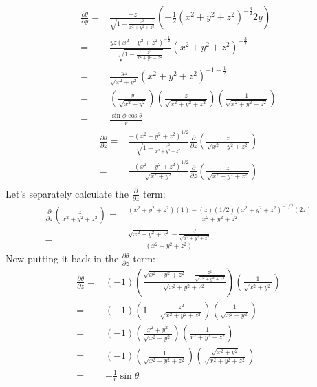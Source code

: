                 \begin{align*}
                     \frac{\partial\theta}{\partial y} = & \frac{-z}{\sqrt{1-\frac{z^2}{x^2 + y^2 + z^2}}}\left(-\frac{1}{2}\left(x^2 + y^2 + z^2\right)^{-\frac{3}{2}}2y\right) \\
                     = & \frac{yz\left(x^2+y^2+z^2\right)^{-\frac{1}{2}}}{\sqrt{1-\frac{z^2}{x^2 + y^2 + z^2}}}\left(x^2 + y^2 + z^2\right)^{-\frac{3}{2}} \\
                     = & \frac{yz}{\sqrt{x^2 + y^2}}\left(x^2 + y^2 + z^2\right)^{-1-\frac{1}{2}} \\
                     = & \left(\frac{y}{\sqrt{x^2 + y^2}}\right)\left(\frac{z}{\sqrt{x^2 + y^2 + z^2}}\right)\left(\frac{1}{\sqrt{x^2 + y^2 + z^2}}\right) \\
                     = & \frac{\sin\phi\cos\theta}{r}
                \end{align*}
                \begin{align*}
                    \frac{\partial\theta}{\partial z} = & \frac{-\left(x^2 + y^2 + z^2\right)^{1/2}}{\sqrt{1-\frac{z^2}{x^2 + y^2 + z^2}}}\frac{\partial}{\partial z}\left(\frac{z}{\sqrt{x^2 + y^2 + z^2}}\right) \\
                    = & \frac{-\left(x^2 + y^2 + z^2\right)^{1/2}}{\sqrt{x^2 + y^2}}\frac{\partial}{\partial z}\left(\frac{z}{\sqrt{x^2 + y^2 + z^2}}\right) \\
                \end{align*}
                Let's separately calculate the $\frac{\partial}{\partial z}$ term:
                \begin{align*}
                    \frac{\partial}{\partial z}\left(\frac{z}{x^2 + y^2 + z^2}\right) = & \frac{
                        \left(x^2 + y^2 + z^2\right)(1) - (z)(1/2)\left(x^2 + y^2 + z^2\right)^{-1/2}(2z)
                    }{x^2 + y^2 + z^2}\\
                    = & \frac{\sqrt{x^2 + y^2 + z^2} - \frac{z^2}{\sqrt{x^2 + y^2 + z^2}}}{(x^2 + y^2 + z^2)}
                \end{align*}
                Now putting it back in the $\frac{\partial\theta}{\partial z}$ term:
                \begin{align*}
                    \frac{\partial\theta}{\partial z} = & (-1)\left(\frac{\sqrt{x^2 + y^2 + z^2} - \frac{z^2}{\sqrt{x^2 + y^2 + z^2}}}{\sqrt{x^2 + y^2 + z^2}}\right)\left(\frac{1}{\sqrt{x^2 + y^2}}\right) \\
                    = & (-1)\left(1-\frac{z^2}{\sqrt{x^2 + y^2 + z^2}}\right)\left(\frac{1}{\sqrt{x^2 + y^2}}\right) \\
                    = & (-1)\left(\frac{x^2 + y^2}{\sqrt{x^2 + y^2}}\right)\left(\frac{1}{x^2 + y^2 + z^2}\right) \\
                    = & (-1)\left(\frac{1}{\sqrt{x^2 + y^2 + z^2}}\right)\left(\frac{\sqrt{x^2 + y^2}}{\sqrt{x^2 + y^2 + z^2}}\right)\\
                    = & -\frac{1}{r}\sin\theta
                \end{align*}
